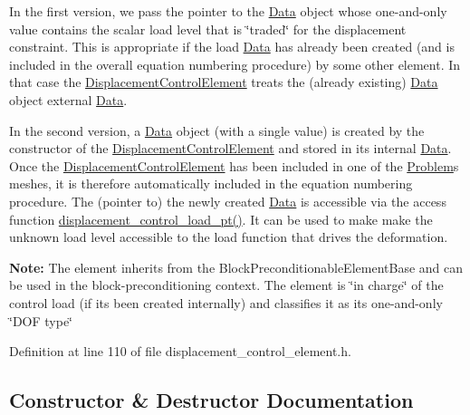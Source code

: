 \begin{DoxyItemize}
\item In the first version, we pass the pointer to the {\ttfamily \hyperlink{classoomph_1_1Data}{Data}} object whose one-\/and-\/only value contains the scalar load level that is \char`\"{}traded\char`\"{} for the displacement constraint. This is appropriate if the load {\ttfamily \hyperlink{classoomph_1_1Data}{Data}} has already been created (and is included in the overall equation numbering procedure) by some other element. In that case the {\ttfamily \hyperlink{classoomph_1_1DisplacementControlElement}{Displacement\+Control\+Element}} treats the (already existing) {\ttfamily \hyperlink{classoomph_1_1Data}{Data}} object external {\ttfamily \hyperlink{classoomph_1_1Data}{Data}}.
\item In the second version, a {\ttfamily \hyperlink{classoomph_1_1Data}{Data}} object (with a single value) is created by the constructor of the {\ttfamily \hyperlink{classoomph_1_1DisplacementControlElement}{Displacement\+Control\+Element}} and stored in its internal {\ttfamily \hyperlink{classoomph_1_1Data}{Data}}. Once the {\ttfamily \hyperlink{classoomph_1_1DisplacementControlElement}{Displacement\+Control\+Element}} has been included in one of the {\ttfamily \hyperlink{classoomph_1_1Problem}{Problem}\textquotesingle{}s} meshes, it is therefore automatically included in the equation numbering procedure. The (pointer to) the newly created {\ttfamily \hyperlink{classoomph_1_1Data}{Data}} is accessible via the access function {\ttfamily \hyperlink{classoomph_1_1DisplacementControlElement_a4bb140bfc80d122542ad52fd0074171f}{displacement\+\_\+control\+\_\+load\+\_\+pt()}}. It can be used to make make the unknown load level accessible to the load function that drives the deformation.
\end{DoxyItemize}{\bfseries Note\+:} The element inherits from the Block\+Preconditionable\+Element\+Base and can be used in the block-\/preconditioning context. The element is \char`\"{}in charge\char`\"{} of the control load (if it\textquotesingle{}s been created internally) and classifies it as its one-\/and-\/only \char`\"{}\+D\+O\+F type\char`\"{} 

Definition at line 110 of file displacement\+\_\+control\+\_\+element.\+h.



\subsection{Constructor \& Destructor Documentation}
\mbox{\label{classoomph_1_1DisplacementControlElement_a697f1427737b62c8ce6d571eb2db2f55}} 
